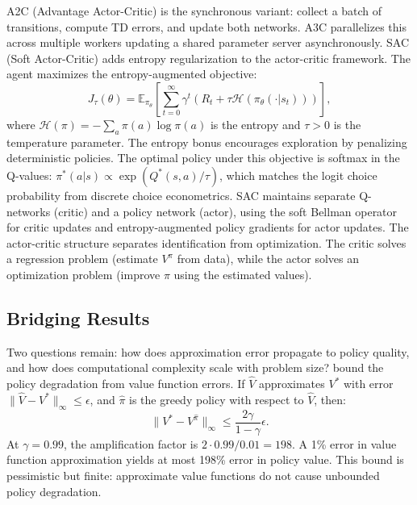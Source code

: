 A2C (Advantage Actor-Critic) is the synchronous variant: collect a batch of transitions, compute TD errors, and update both networks. A3C \citep{mnih2016a3c} parallelizes this across multiple workers updating a shared parameter server asynchronously. SAC (Soft Actor-Critic) \citep{Haarnoja2018} adds entropy regularization to the actor-critic framework. The agent maximizes the entropy-augmented objective:
\begin{equation}
J_\tau(\theta) = \mathbb{E}_{\pi_\theta}\left[\sum_{t=0}^\infty \gamma^t \left(R_t + \tau \mathcal{H}(\pi_\theta(\cdot|s_t))\right)\right],
\end{equation}
where $\mathcal{H}(\pi) = -\sum_a \pi(a) \log \pi(a)$ is the entropy and $\tau > 0$ is the temperature parameter. The entropy bonus encourages exploration by penalizing deterministic policies. The optimal policy under this objective is softmax in the Q-values: $\pi^*(a|s) \propto \exp(Q^*(s,a)/\tau)$, which matches the logit choice probability from discrete choice econometrics. SAC maintains separate Q-networks (critic) and a policy network (actor), using the soft Bellman operator for critic updates and entropy-augmented policy gradients for actor updates. The actor-critic structure separates identification from optimization. The critic solves a regression problem (estimate $V^\pi$ from data), while the actor solves an optimization problem (improve $\pi$ using the estimated values).


\subsection{Bridging Results}
\label{sec:bridging_results}

Two questions remain: how does approximation error propagate to policy quality, and how does computational complexity scale with problem size? \citet{singh1994} bound the policy degradation from value function errors. If $\hat{V}$ approximates $V^*$ with error $\|\hat{V} - V^*\|_\infty \leq \epsilon$, and $\hat{\pi}$ is the greedy policy with respect to $\hat{V}$, then:
\begin{equation}
\|V^* - V^{\hat{\pi}}\|_\infty \leq \frac{2\gamma}{1-\gamma} \epsilon.
\label{eq:singh_yee}
\end{equation}
At $\gamma = 0.99$, the amplification factor is $2 \cdot 0.99 / 0.01 = 198$. A 1\% error in value function approximation yields at most 198\% error in policy value. This bound is pessimistic but finite: approximate value functions do not cause unbounded policy degradation.

